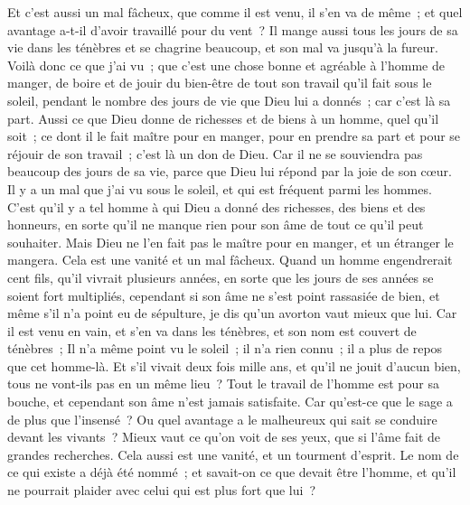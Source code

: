\begin{multicols}{2}
Et c'est aussi un mal fâcheux, que comme il est venu, il s'en va de même~; et quel avantage a-t-il d'avoir travaillé pour du vent~?
Il mange aussi tous les jours de sa vie dans les ténèbres et se chagrine beaucoup, et son mal va jusqu'à la fureur.
Voilà donc ce que j'ai vu~; que c'est une chose bonne et agréable à l'homme de manger, de boire et de jouir du bien-être de tout son travail qu'il fait sous le soleil, pendant le nombre des jours de vie que Dieu lui a donnés~; car c'est là sa part.
Aussi ce que Dieu donne de richesses et de biens à un homme, quel qu'il soit~; ce dont il le fait maître pour en manger, pour en prendre sa part et pour se réjouir de son travail~; c'est là un don de Dieu. 
Car il ne se souviendra pas beaucoup des jours de sa vie, parce que Dieu lui répond par la joie de son cœur. 
\VerseOne{}Il y a un mal que j'ai vu sous le soleil, et qui est fréquent parmi les hommes.
C'est qu'il y a tel homme à qui Dieu a donné des richesses, des biens et des honneurs, en sorte qu'il ne manque rien pour son âme de tout ce qu'il peut souhaiter. Mais Dieu ne l'en fait pas le maître pour en manger, et un étranger le mangera. Cela est une vanité et un mal fâcheux. 
Quand un homme engendrerait cent fils, qu'il vivrait plusieurs années, en sorte que les jours de ses années se soient fort multipliés, cependant si son âme ne s'est point rassasiée de bien, et même s'il n'a point eu de sépulture, je dis qu'un avorton vaut mieux que lui.
Car il est venu en vain, et s'en va dans les ténèbres, et son nom est couvert de ténèbres~;
Il n'a même point vu le soleil~; il n'a rien connu~; il a plus de repos que cet homme-là.
Et s'il vivait deux fois mille ans, et qu'il ne jouit d'aucun bien, tous ne vont-ils pas en un même lieu~?
Tout le travail de l'homme est pour sa bouche, et cependant son âme n'est jamais satisfaite.
Car qu'est-ce que le sage a de plus que l'insensé~? Ou quel avantage a le malheureux qui sait se conduire devant les vivants~?
Mieux vaut ce qu'on voit de ses yeux, que si l'âme fait de grandes recherches. Cela aussi est une vanité, et un tourment d'esprit.
Le nom de ce qui existe a déjà été nommé~; et savait-on ce que devait être l'homme, et qu'il ne pourrait plaider avec celui qui est plus fort que lui~? 

\end{multicols}

